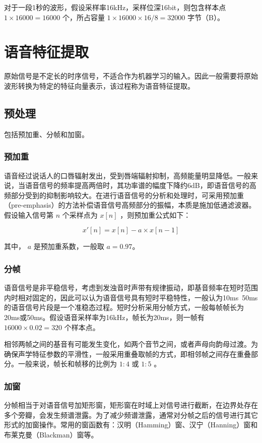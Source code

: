 \documentclass[cn,10pt,math=newtx,citestyle=gb7714-2015,bibstyle=gb7714-2015]{elegantbook}
\begin{document}
对于一段1秒的波形，假设采样率16kHz，采样位深16bit，则包含样本点 $1\times 16000=16000$ 个，所占容量 $1\times 16000\times 16 /8=32000$ 字节（B）。








\chapter{语音特征提取}
原始信号是不定长的时序信号，不适合作为机器学习的输入。因此一般需要将原始波形转换为特定的特征向量表示，该过程称为语音特征提取。

\section{预处理}
包括预加重、分帧和加窗。

\subsection{预加重}
语音经过说话人的口唇辐射发出，受到唇端辐射抑制，高频能量明显降低。一般来说，当语音信号的频率提高两倍时，其功率谱的幅度下降约6dB，即语音信号的高频部分受到的抑制影响较大。在进行语音信号的分析和处理时，可采用预加重（pre-emphasis）的方法补偿语音信号高频部分的振幅，本质是施加低通滤波器。假设输入信号第 $n$ 个采样点为 $x[n]$ ，则预加重公式如下：

\begin{equation}
  x'[n]=x[n]-a\times x[n-1]
\end{equation}

其中， $a$ 是预加重系数，一般取 $a=0.97$。

\subsection{分帧}
语音信号是非平稳信号，考虑到发浊音时声带有规律振动，即基音频率在短时范围内时相对固定的，因此可以认为语音信号具有短时平稳特性，一般认为10ms~50ms的语音信号片段是一个准稳态过程。短时分析采用分帧方式，一般每帧帧长为20ms或50ms。假设语音采样率为16kHz，帧长为20ms，则一帧有 $16000\times 0.02=320$ 个样本点。

相邻两帧之间的基音有可能发生变化，如两个音节之间，或者声母向韵母过渡。为确保声学特征参数的平滑性，一般采用重叠取帧的方式，即相邻帧之间存在重叠部分。一般来说，帧长和帧移的比例为 $1:4$ 或 $1:5$ 。

\subsection{加窗}
分帧相当于对语音信号加矩形窗，矩形窗在时域上对信号进行截断，在边界处存在多个旁瓣，会发生频谱泄露。为了减少频谱泄露，通常对分帧之后的信号进行其它形式的加窗操作。常用的窗函数有：汉明（Hamming）窗、汉宁（Hanning）窗和布莱克曼（Blackman）窗等。
\end{document}
